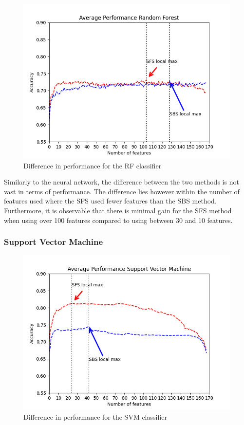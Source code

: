 \documentclass{kththesis}
\begin{document}
\begin{figure}[h!]
  \begin{center}
    \includegraphics[scale=0.8]{./figures/Figure_4.png}
    \caption{Difference in performance for the RF classifier}
  \end{center}
\end{figure}

Similarly to the neural network, the difference between the two methods is not vast in terms of performance. The difference lies however within the number of features used where the SFS used fewer features than the SBS method. Furthermore, it is observable that there is minimal gain for the SFS method when using over 100 features compared to using between 30 and 10 features.

\newpage

\subsubsection{Support Vector Machine}

\begin{figure}[h!]
  \begin{center}
    \includegraphics[scale=0.8]{./figures/Figure_3.png}
    \caption{Difference in performance for the SVM classifier}
    \label{fig:svm}
  \end{center}
\end{figure}
\end{document}
